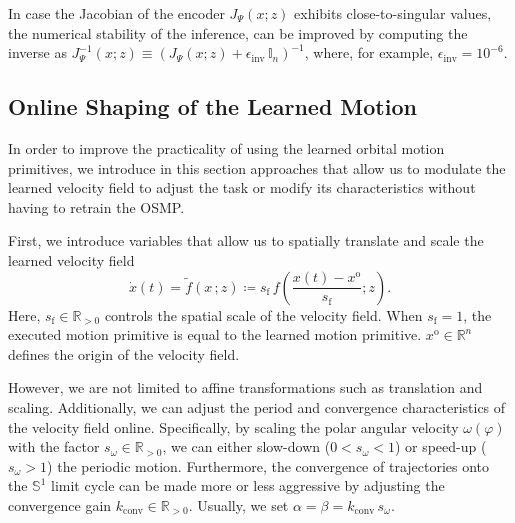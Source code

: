 In case the Jacobian of the encoder $J_\Psi(x;z)$ exhibits close-to-singular values, the numerical stability of the inference, can be improved by computing the inverse as $J_\Psi^{-1}(x;z) \equiv \left ( J_\Psi(x;z) + \epsilon_\mathrm{inv} \, \mathbb{I}_n \right )^{-1}$, where, for example, $\epsilon_\mathrm{inv} = 10^{-6}$.

\subsection{Online Shaping of the Learned Motion}
In order to improve the practicality of using the learned orbital motion primitives, we introduce in this section approaches that allow us to modulate the learned velocity field to adjust the task or modify its characteristics without having to retrain the \gls{OSMP}. 

First, we introduce variables that allow us to spatially translate and scale the learned velocity field
\begin{equation}
    \dot{x}(t) = \tilde{f}(x \, ;z) \coloneq s_\mathrm{f} \, f \left ( \frac{x(t)-x^\mathrm{o}}{s_\mathrm{f}}; z \right ).
\end{equation}
Here, $s_\mathrm{f} \in \mathbb{R}_{>0}$ controls the spatial scale of the velocity field. When $s_\mathrm{f} = 1$, the executed motion primitive is equal to the learned motion primitive. $x^\mathrm{o} \in \mathbb{R}^{n}$ defines the origin of the velocity field.

However, we are not limited to affine transformations such as translation and scaling. Additionally, we can adjust the period and convergence characteristics of the velocity field online. Specifically, by scaling the polar angular velocity $\omega(\varphi)$ with the factor $s_\omega \in \mathbb{R}_{>0}$, we can either slow-down ($0 < s_\omega < 1$) or speed-up ($s_\omega > 1$) the periodic motion.
Furthermore, the convergence of trajectories onto the $\mathbb{S}^1$ limit cycle can be made more or less aggressive by adjusting the convergence gain $k_\mathrm{conv} \in \mathbb{R}_{>0}$. Usually, we set $\alpha = \beta = k_\mathrm{conv} \, s_\omega$.

